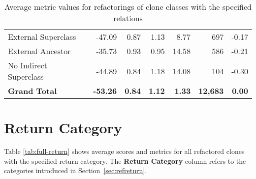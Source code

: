 \begin{appendices}
\begin{table}[H]
{\begin{tabular}{@{}lrrrrrr@{}}
\hspace{10pt} External Superclass & -47.09 & 0.87 & 1.13 & 8.77 & 697 & -0.17 \\
\hspace{10pt} External Ancestor & -35.73 & 0.93 & 0.95 & 14.58 & 586 & -0.21 \\
\hspace{10pt} No Indirect Superclass & -44.89 & 0.84 & 1.18 & 14.08 & 104 & -0.30 \\ \midrule
\textbf{Grand Total} & \textbf{-53.26} & \textbf{0.84} & \textbf{1.12} & \textbf{1.33} & \textbf{12,683} & \textbf{0.00} \\ \bottomrule
\end{tabular}%
}
\caption{Average metric values for refactorings of clone classes with the specified relations}
\label{tab:full-relation}
\end{table}

\section{Return Category}
Table \ref{tab:full-return} shows average scores and metrics for all refactored clones with the specified return category. The \textbf{Return Category} column refers to the categories introduced in Section~\ref{sec:refreturn}.
\begin{table}[H]
\centering
{}
\caption{Average metric values for refactorings of clone classes with the specified return category}
\label{tab:full-return}
\end{table}
\newpage


\end{appendices}
